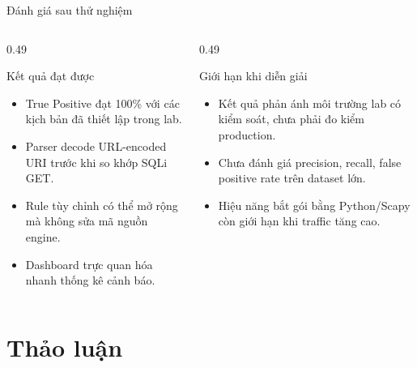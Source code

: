 \documentclass[t, aspectratio=169]{beamer}
\begin{document}
\begin{frame}{Đánh giá sau thử nghiệm}
    \small
    \begin{columns}[T,onlytextwidth]
        \begin{column}{0.49\textwidth}
            \begin{block}{Kết quả đạt được}
                \begin{itemize}
                    \item True Positive đạt 100\% với các kịch bản đã thiết lập trong lab.
                    \item Parser decode URL-encoded URI trước khi so khớp SQLi GET.
                    \item Rule tùy chỉnh có thể mở rộng mà không sửa mã nguồn engine.
                    \item Dashboard trực quan hóa nhanh thống kê cảnh báo.
                \end{itemize}
            \end{block}
        \end{column}
        \begin{column}{0.49\textwidth}
            \begin{alertblock}{Giới hạn khi diễn giải}
                \begin{itemize}
                    \item Kết quả phản ánh môi trường lab có kiểm soát, chưa phải đo kiểm production.
                    \item Chưa đánh giá precision, recall, false positive rate trên dataset lớn.
                    \item Hiệu năng bắt gói bằng Python/Scapy còn giới hạn khi traffic tăng cao.
                \end{itemize}
            \end{alertblock}
        \end{column}
    \end{columns}
\end{frame}

\section{Thảo luận}
\end{document}
